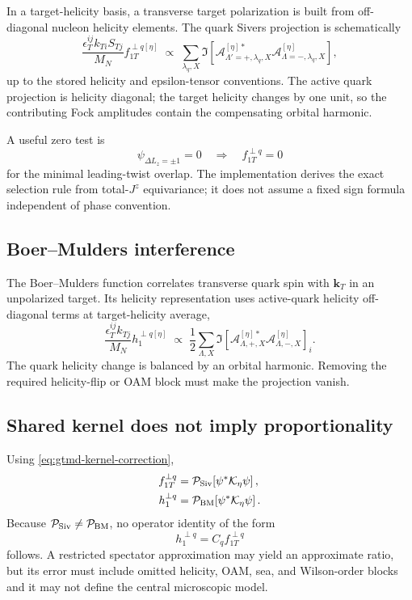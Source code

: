\documentclass[11pt]{article}
\newcommand{\kT}{\bm{k}_{T}}
\newcommand{\cK}{\mathcal K}
\newcommand{\cP}{\mathcal P}
\newcommand{\cA}{\mathcal A}
\begin{document}
In a target-helicity basis, a transverse target polarization is built from
off-diagonal nucleon helicity elements.  The quark Sivers projection is
schematically
\begin{equation}
 \frac{\epsilon_T^{ij}k_{Ti}S_{Tj}}{M_N}
 f_{1T}^{\perp q[\eta]}
 \;\propto\;
 \sum_{\lambda_q,X}
 \Im\!\left[
 \cA_{\Lambda'=+,\lambda_q,X}^{[\eta]*}
 \cA_{\Lambda=-,\lambda_q,X}^{[\eta]}
 \right],
\label{eq:sivers-helicity-interference}
\end{equation}
up to the stored helicity and epsilon-tensor conventions.  The active quark
projection is helicity diagonal; the target helicity changes by one unit, so
the contributing Fock amplitudes contain the compensating orbital harmonic.

A useful zero test is
\begin{equation}
 \psi_{\Delta L_z=\pm1}=0
 \quad\Longrightarrow\quad
 f_{1T}^{\perp q}=0
\label{eq:sivers-oam-zero}
\end{equation}
for the minimal leading-twist overlap.  The implementation derives the exact
selection rule from total-\(J^z\) equivariance; it does not assume a fixed
sign formula independent of phase convention.

\subsection{Boer--Mulders interference}

The Boer--Mulders function correlates transverse quark spin with \(\kT\) in an
unpolarized target.  Its helicity representation uses active-quark helicity
off-diagonal terms at target-helicity average,
\begin{equation}
 \frac{\epsilon_T^{ij}k_{Tj}}{M_N}
 h_1^{\perp q[\eta]}
 \;\propto\;
 \frac12\sum_{\Lambda,X}
 \Im\!\left[
 \cA_{\Lambda,+,X}^{[\eta]*}
 \cA_{\Lambda,-,X}^{[\eta]}
 \right]_i.
\label{eq:boer-mulders-helicity-interference}
\end{equation}
The quark helicity change is balanced by an orbital harmonic.  Removing the
required helicity-flip or OAM block must make the projection vanish.

\subsection{Shared kernel does not imply proportionality}

Using \cref{eq:gtmd-kernel-correction},
\begin{align}
 f_{1T}^{\perp q}
 &=\cP_{\rm Siv}\!
 \left[\psi^*\cK_\eta\psi\right],
\label{eq:sivers-projector-kernel}\\
 h_1^{\perp q}
 &=\cP_{\rm BM}\!
 \left[\psi^*\cK_\eta\psi\right].
\label{eq:bm-projector-kernel}
\end{align}
Because \(\cP_{\rm Siv}\neq\cP_{\rm BM}\), no operator identity of the form
\begin{equation}
 h_1^{\perp q}=C_q f_{1T}^{\perp q}
\label{eq:forbidden-bm-sivers-identity}
\end{equation}
follows.  A restricted spectator approximation may yield an approximate
ratio, but its error must include omitted helicity, OAM, sea, and Wilson-order
blocks and it may not define the central microscopic model.
\end{document}
